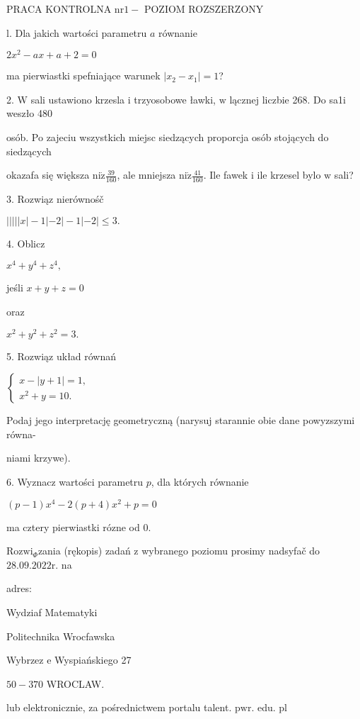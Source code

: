 \documentclass[a4paper,12pt]{article}
\begin{document}
PRACA KONTROLNA $\mathrm{n}\mathrm{r} 1 -$ POZIOM ROZSZERZONY

l. Dla jakich wartości parametru $a$ równanie

$2x^{2}-ax+a+2=0$

ma pierwiastki spefniające warunek $|x_{2}-x_{1}|=1$?

2. $\mathrm{W}$ sali ustawiono krzesla $\mathrm{i}$ trzyosobowe ławki, $\mathrm{w}$ lącznej liczbie 268. Do sa1i weszło 480

osób. Po zajeciu wszystkich miejsc siedzących proporcja osób stojących do siedzących

okazafa się większa $\displaystyle \mathrm{n}\mathrm{i}\dot{\mathrm{z}}\frac{39}{160}$, ale mniejsza $\displaystyle \mathrm{n}\mathrm{i}\dot{\mathrm{z}}\frac{41}{160}$. Ile fawek $\mathrm{i}$ ile krzesel bylo $\mathrm{w}$ sali?

3. Rozwiąz nierównośč

$|||||x|-1|-2|-1|-2|\leq 3.$

4. Oblicz

$x^{4}+y^{4}+z^{4},$

jeśli $x+y+z=0$

oraz

$x^{2}+y^{2}+z^{2}=3.$

5. Rozwiąz układ równań

$\left\{\begin{array}{l}
x-|y+1|=1,\\
x^{2}+y=10.
\end{array}\right.$

Podaj jego interpretację geometryczną (narysuj starannie obie dane powyzszymi równa-

niami krzywe).

6. Wyznacz wartości parametru $p$, dla których równanie

$(p-1)x^{4}-2(p+4)x^{2}+p=0$

ma cztery pierwiastki rózne od 0.

$\mathrm{R}\mathrm{o}\mathrm{z}\mathrm{w}\mathrm{i}_{\Phi}$zania (rękopis) zadań $\mathrm{z}$ wybranego poziomu prosimy nadsyfač do $28.09.2022\mathrm{r}$. na

adres:

Wydziaf Matematyki

Politechnika Wrocfawska

Wybrzez $\mathrm{e}$ Wyspiańskiego 27

$50-370$ WROCLAW.

lub elektronicznie, za pośrednictwem portalu talent. $\mathrm{p}\mathrm{w}\mathrm{r}$. edu. pl
\end{document}
